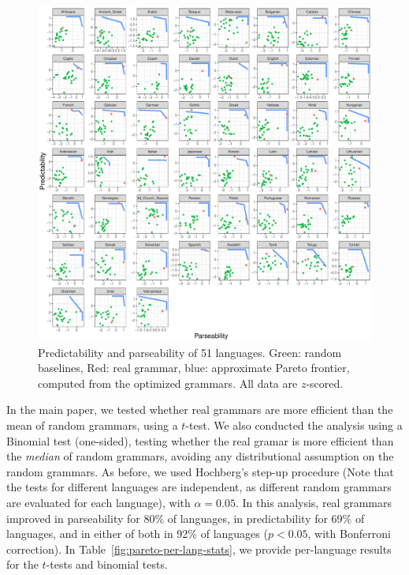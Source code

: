 \documentclass[10pt,twoside,lineno]{article}
\begin{document}
\begin{figure}
\centering
\includegraphics[width=\textwidth]{../results/plane/pareto-plane-perLanguage.pdf}
\caption{Predictability and parseability of 51 languages. Green: random baselines, Red: real grammar, blue: approximate Pareto frontier, computed from the optimized grammars. All data are $z$-scored.}\label{fig:pareto-per-lang}
\end{figure}




In the main paper, we tested whether real grammars are more efficient than the mean of random grammars, using a $t$-test.
We also conducted the analysis using a Binomial test (one-sided), testing whether the real gramar is more efficient than the \emph{median} of random grammars, avoiding any distributional assumption on the random grammars.
As before, we used Hochberg's step-up procedure (Note that the tests for different languages are independent, as different random grammars are evaluated for each language), with $\alpha=0.05$.
In this analysis, real grammars improved in parseability for 80\% of languages, in predictability for 69\% of languages, and in either of both in 92\% of languages ($p<0.05$, with Bonferroni correction).
In Table~\ref{fig:pareto-per-lang-stats}, we provide per-language results for the $t$-tests and binomial tests.
\end{document}
